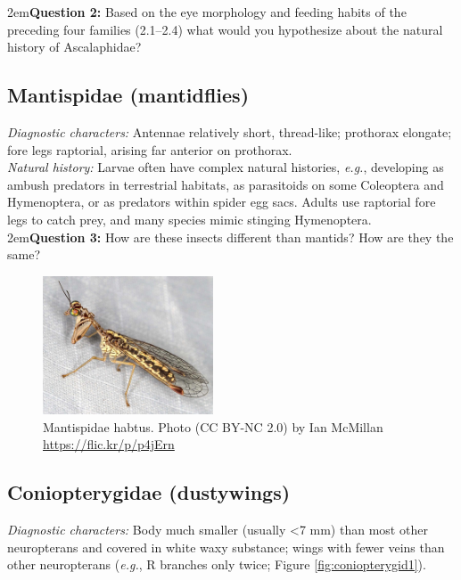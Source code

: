 \documentclass[letterpaper, 11pt]{article}
\begin{document}
\hangindent2em\textbf{Question 2:}  Based on the eye morphology and feeding habits of the preceding four families (2.1--2.4) what would you hypothesize about the natural history of Ascalaphidae?

\subsection{Mantispidae (mantidflies)}
\noindent{}\textit{Diagnostic characters:} Antennae relatively short, thread-like; prothorax elongate; fore legs raptorial, arising far anterior on prothorax.\\

\noindent{}\textit{Natural history:} Larvae often have complex natural histories, \textit{e.g.}, developing as ambush predators in terrestrial habitats, as parasitoids on some Coleoptera and Hymenoptera, or as predators within spider egg sacs. Adults use raptorial fore legs to catch prey, and many species mimic stinging Hymenoptera.\\

\hangindent2em\textbf{Question 3:}  How are these insects different than mantids? How are they the same?

\begin{figure}[ht!]
  \centering
    \includegraphics[width=0.45\textwidth]{figures/MantispidHabitus}
  \caption{Mantispidae habtus. Photo (CC BY-NC 2.0) by Ian McMillan \url{https://flic.kr/p/p4jErn}}
  \label{fig:mantispid}
\end{figure}

\subsection{Coniopterygidae (dustywings)}
\noindent{}\textit{Diagnostic characters:} Body much smaller (usually \textless7 mm) than most other neuropterans and covered in white waxy substance; wings with fewer veins than other neuropterans (\textit{e.g.}, R branches only twice; Figure \ref{fig:coniopterygid1}).\\
\end{document}
